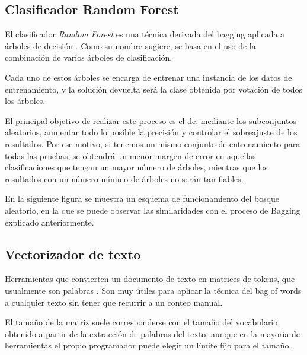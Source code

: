 


\subsection{Clasificador Random Forest}

El clasificador \emph{Random Forest} es una técnica derivada del bagging aplicada a árboles de decisión \cite{randomforestclassifier}. Como su nombre sugiere, se basa en el uso de la combinación de varios árboles de clasificación. 

Cada uno de estos árboles se encarga de entrenar una instancia de los datos de entrenamiento, y la solución devuelta será la clase obtenida por votación de todos los árboles. 

El principal objetivo de realizar este proceso es el de, mediante los subconjuntos aleatorios, aumentar todo lo posible la precisión y controlar el sobreajuste de los resultados. Por ese motivo, si tenemos un mismo conjunto de entrenamiento para todas las pruebas, se obtendrá un menor margen de error en aquellas clasificaciones que tengan un mayor número de árboles, mientras que los resultados con un número mínimo de árboles no serán tan fiables \cite{randomforestclassifierberkeley}.

En la siguiente figura se muestra un esquema de funcionamiento del bosque aleatorio, en la que se puede observar las similaridades con el proceso de Bagging explicado anteriormente.




\subsection{Vectorizador de texto}

Herramientas que convierten un documento de texto en matrices de tokens, que usualmente son palabras  \cite{countvectorizer}.
Son muy útiles para aplicar la técnica del bag of words a cualquier texto sin tener que recurrir a un conteo manual.

El tamaño de la matriz suele corresponderse con el tamaño del vocabulario obtenido a partir de la extracción de palabras del texto, aunque en la mayoría de herramientas el propio programador puede elegir un límite fijo para el tamaño. 

